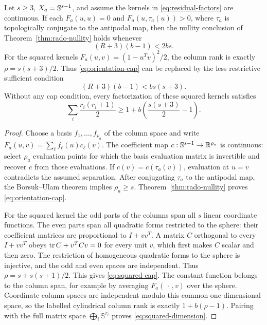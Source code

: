 \begin{corollary}\label{cor:flat-nullity}
Let $s\geq3$, $X_a=\mathbb S^{s-1}$, and assume the kernels in
\eqref{eq:residual-factors} are continuous. If each $F_a(u,u)=0$ and
$F_a(u,\tau_a(u))>0$, where $\tau_a$ is topologically conjugate to the
antipodal map, then the nullity conclusion of
Theorem~\ref{thm:rado-nullity} holds whenever
\begin{equation}\label{eq:orientation-cap}
 (R+3)(b-1)<2bs.
\end{equation}
For the squared kernels
$F_a(u,v)=(1-u^Tv)^2/2$, the column rank is exactly
$\rho=s(s+3)/2$. Thus \eqref{eq:orientation-cap} can be replaced by
the less restrictive sufficient condition
\begin{equation}\label{eq:squared-cap}
 (R+3)(b-1)<b s(s+3).
\end{equation}
Without any cap condition, every factorization of these squared kernels
satisfies
\begin{equation}\label{eq:squared-dimension}
 \sum_i\frac{r_i(r_i+1)}2\geq1+b\left(\frac{s(s+3)}2-1\right).
\end{equation}
\end{corollary}
\begin{proof}
Choose a basis $f_1,\ldots,f_{\rho_a}$ of the column space and write
$F_a(u,v)=\sum_\ell f_\ell(u)c_\ell(v)$. The coefficient map
$c:\mathbb S^{s-1}\to\mathbb R^{\rho_a}$ is continuous: select $\rho_a$
evaluation points for which the basis evaluation matrix is invertible
and recover $c$ from those evaluations. If $c(v)=c(\tau_a(v))$, evaluation
at $u=v$ contradicts the assumed separation. After conjugating $\tau_a$
to the antipodal map, the Borsuk--Ulam theorem
\citep[Section 2.2]{Hatcher2002} implies $\rho_a\geq s$.
Theorem~\ref{thm:rado-nullity} proves \eqref{eq:orientation-cap}.

For the squared kernel the odd parts of the columns span all $s$ linear
coordinate functions. The even parts span all quadratic forms restricted
to the sphere: their coefficient matrices are proportional to $I+vv^T$.
A matrix $C$ orthogonal to every $I+vv^T$ obeys
$\operatorname{tr} C+v^TCv=0$ for every unit $v$, which first makes $C$ scalar and then
zero. The restriction of homogeneous quadratic forms to the sphere is
injective, and the odd and even spaces are independent. Thus
$\rho=s+s(s+1)/2$. This gives \eqref{eq:squared-cap}.
The constant function belongs to the column span, for example by averaging
$F_a(\,\cdot\,,v)$ over the sphere. Coordinate column spaces are
independent modulo this common one-dimensional space, so the labelled
cylindrical column rank is exactly $1+b(\rho-1)$. Pairing with the full
matrix space $\bigoplus_i\mathbb S^{r_i}$ proves
\eqref{eq:squared-dimension}.
\end{proof}

